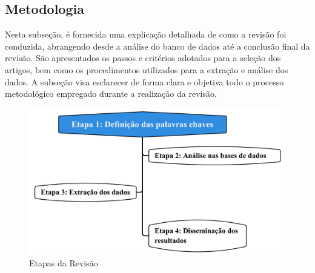 \subsection{Metodologia}\label{subsec:met da revisão}

Nesta subseção, é fornecida uma explicação detalhada de como a revisão foi conduzida, abrangendo desde a análise do banco de dados até a conclusão final da revisão. São apresentados os passos e critérios adotados para a seleção dos artigos, bem como os procedimentos utilizados para a extração e análise dos dados. A subseção visa esclarecer de forma clara e objetiva todo o processo metodológico empregado durante a realização da revisão.

\begin{figure}[H]
	\centering
	\caption{Etapas da Revisão}
	\label{fig:rsl}
	\includegraphics[width=0.9\linewidth]{Revisao/Figuras/RSL}
	
\end{figure}



